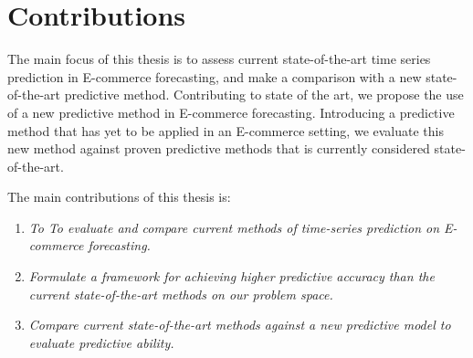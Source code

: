 \section{Contributions}
\label{sections:Introduction:Contributions}



The main focus of this thesis is to assess current state-of-the-art time series prediction in E-commerce forecasting,
and make a comparison with a new state-of-the-art predictive method.
Contributing to state of the art,
we propose the use of a new predictive method in E-commerce forecasting.
Introducing a predictive method that has yet to be applied in an E-commerce setting,
we evaluate this new method against proven predictive methods that is currently considered state-of-the-art.

The main contributions of this thesis is:
\begin{enumerate}
  \item {\it To To evaluate and compare current methods of time-series prediction on E-commerce forecasting.}
  \item {\it Formulate a framework for achieving higher predictive accuracy than the current state-of-the-art methods on our problem space.}
  \item {\it Compare current state-of-the-art methods against a new predictive model to evaluate predictive ability.}
\end{enumerate}




\iffalse
The main focus of this work is to assess the current state of time-series prediction in E-commerce forecasting.
Contributing to the current state of the art,
we propose a method for increasing the predictive ability of time-series forecasting
assessing interest trends of e-commerce product categories.
The main contributions of this thesis are:

\begin{enumerate}
  \item {\it To evaluate and compare current methods of time-series prediction on e-commerce.}
  \item {\it To evaluate and compare current state-of-the-art methods for time-series forecasting.}
  \item {\it Formulates a framework for achieving higher predictive accuracy than the current state-of-the-art methods on our problem space.}
\end{enumerate}
\fi


